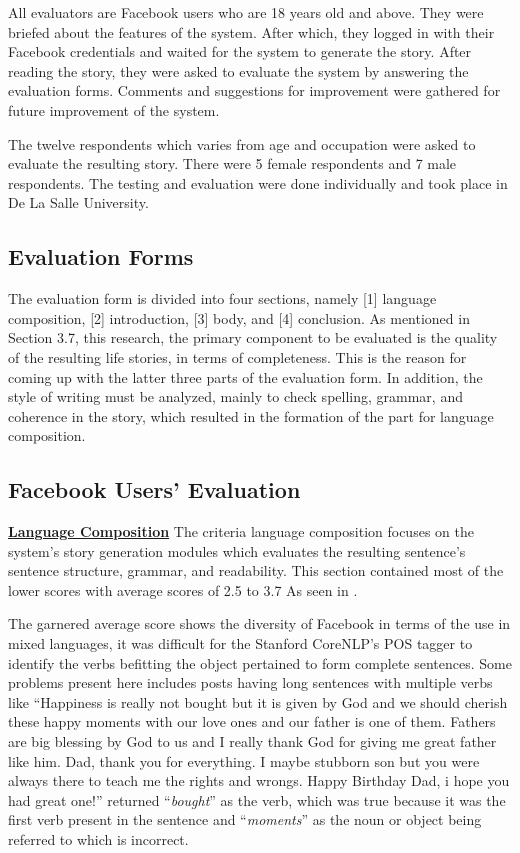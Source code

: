 All evaluators are Facebook users who are 18 years old and above. They were briefed about the features of the system. After which, they logged in with their Facebook credentials and waited for the system to generate the story. After reading the story, they were asked to evaluate the system by answering the evaluation forms. Comments and suggestions for improvement were gathered for future improvement of the system.

The twelve respondents which varies from age and occupation  were asked to evaluate the resulting story. There were 5 female respondents and 7 male respondents. The testing and evaluation were done individually and took place in De La Salle University.

\subsection{Evaluation Forms}
The evaluation form is divided into four sections, namely [1] language composition, [2] introduction, [3] body, and [4] conclusion. As mentioned in Section 3.7, this research, the primary component to be evaluated is the quality of the resulting life stories, in terms of completeness. This is the reason for coming up with the latter three parts of the evaluation form. In addition, the style of writing must be analyzed, mainly to check spelling, grammar, and coherence in the story, which resulted in the formation of the part for language composition.

\subsection{Facebook Users’ Evaluation}
\underline{\textbf{Language Composition}}
The criteria language composition focuses on the system’s story generation modules which evaluates the resulting sentence’s sentence structure, grammar, and readability. This section contained most of the lower scores with average scores of 2.5 to 3.7 As seen in .

The garnered average score shows the diversity of Facebook in terms of the use in mixed languages, it was difficult for the Stanford CoreNLP’s POS tagger to identify the verbs befitting the object pertained to form complete sentences. Some problems present here includes posts having long sentences with multiple verbs like “Happiness is really not bought but it is given by God and we should cherish these happy moments with our love ones and our father is one of them. Fathers are  big blessing by God to us and I really thank God for giving me great father like him. Dad, thank you for everything. I maybe stubborn son but you were always there to teach me the rights and wrongs. Happy Birthday Dad, i hope you had great one!” returned “\textit{bought}” as the verb, which was true because it was the first verb present in the sentence and “\textit{moments}” as the noun or object being referred to which is incorrect. 

